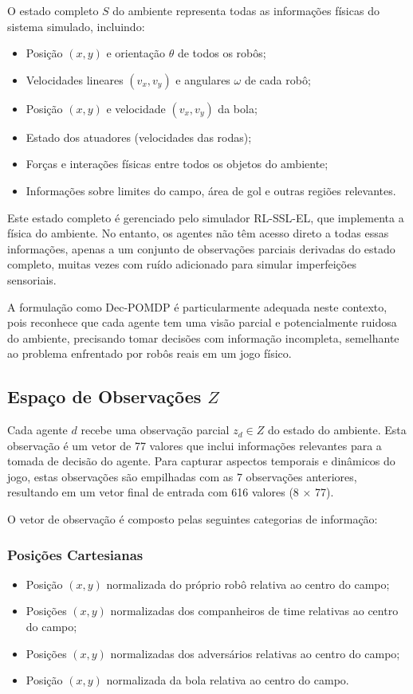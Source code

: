 O estado completo $S$ do ambiente representa todas as informações físicas do sistema simulado, incluindo:

\begin{itemize}
    \item Posição $(x, y)$ e orientação $\theta$ de todos os robôs;
    \item Velocidades lineares $(v_x, v_y)$ e angulares $\omega$ de cada robô;
    \item Posição $(x, y)$ e velocidade $(v_x, v_y)$ da bola;
    \item Estado dos atuadores (velocidades das rodas);
    \item Forças e interações físicas entre todos os objetos do ambiente;
    \item Informações sobre limites do campo, área de gol e outras regiões relevantes.
\end{itemize}

Este estado completo é gerenciado pelo simulador RL-SSL-EL, que implementa a física do ambiente. No entanto, os agentes não têm acesso direto a todas essas informações, apenas a um conjunto de observações parciais derivadas do estado completo, muitas vezes com ruído adicionado para simular imperfeições sensoriais.

A formulação como Dec-POMDP é particularmente adequada neste contexto, pois reconhece que cada agente tem uma visão parcial e potencialmente ruidosa do ambiente, precisando tomar decisões com informação incompleta, semelhante ao problema enfrentado por robôs reais em um jogo físico.

\subsection{Espaço de Observações $Z$}

Cada agente $d$ recebe uma observação parcial $z_d \in Z$ do estado do ambiente. Esta observação é um vetor de 77 valores que inclui informações relevantes para a tomada de decisão do agente. Para capturar aspectos temporais e dinâmicos do jogo, estas observações são empilhadas com as 7 observações anteriores, resultando em um vetor final de entrada com 616 valores (8 × 77).

O vetor de observação é composto pelas seguintes categorias de informação:

\subsubsection{Posições Cartesianas}
\begin{itemize}
    \item Posição $(x, y)$ normalizada do próprio robô relativa ao centro do campo;
    \item Posições $(x, y)$ normalizadas dos companheiros de time relativas ao centro do campo;
    \item Posições $(x, y)$ normalizadas dos adversários relativas ao centro do campo;
    \item Posição $(x, y)$ normalizada da bola relativa ao centro do campo.
\end{itemize}

